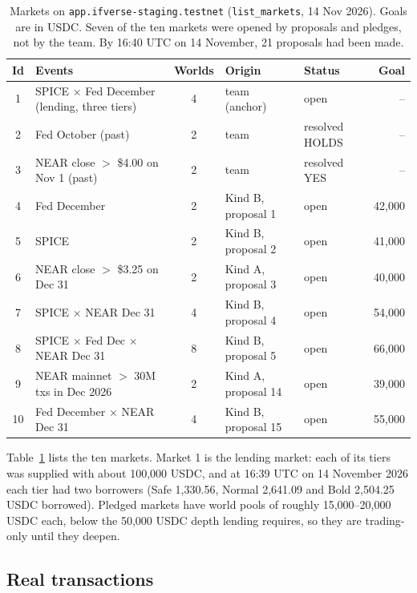 \documentclass[11pt,a4paper]{article}
\newcommand{\code}[1]{\texttt{\small #1}}
\begin{document}
\begin{table}[t]
\centering
\small
\begin{tabularx}{\linewidth}{@{}c>{\raggedright\arraybackslash}Xcllr@{}}
\toprule
\textbf{Id} & \textbf{Events} & \textbf{Worlds} & \textbf{Origin} & \textbf{Status} & \textbf{Goal} \\
\midrule
1 & SPICE $\times$ Fed December (lending, three tiers) & 4 & team (anchor) & open & -- \\
2 & Fed October (past) & 2 & team & resolved \textsf{HOLDS} & -- \\
3 & NEAR close $>$ \$4.00 on Nov 1 (past) & 2 & team & resolved \textsf{YES} & -- \\
4 & Fed December & 2 & Kind B, proposal 1 & open & 42,000 \\
5 & SPICE & 2 & Kind B, proposal 2 & open & 41,000 \\
6 & NEAR close $>$ \$3.25 on Dec 31 & 2 & Kind A, proposal 3 & open & 40,000 \\
7 & SPICE $\times$ NEAR Dec 31 & 4 & Kind B, proposal 4 & open & 54,000 \\
8 & SPICE $\times$ Fed Dec $\times$ NEAR Dec 31 & 8 & Kind B, proposal 5 & open & 66,000 \\
9 & NEAR mainnet $>$ 30M txs in Dec 2026 & 2 & Kind A, proposal 14 & open & 39,000 \\
10 & Fed December $\times$ NEAR Dec 31 & 4 & Kind B, proposal 15 & open & 55,000 \\
\bottomrule
\end{tabularx}
\caption{Markets on \code{app.ifverse-staging.testnet} (\code{list\_markets}, 14 Nov 2026). Goals are in USDC. Seven of
the ten markets were opened by proposals and pledges, not by the team. By 16:40 UTC on 14 November, 21 proposals
had been made.}
\label{tab:markets}
\end{table}

Table~\ref{tab:markets} lists the ten markets. Market 1 is the lending market: each of its tiers was supplied with
about 100,000 USDC, and at 16:39 UTC on 14 November 2026 each tier had two borrowers (Safe 1,330.56, Normal 2,641.09 and Bold
2,504.25 USDC borrowed). Pledged markets have world pools of roughly 15,000--20,000 USDC each, below the 50,000 USDC
depth lending requires, so they are trading-only until they deepen.

\subsection{Real transactions}
\end{document}
